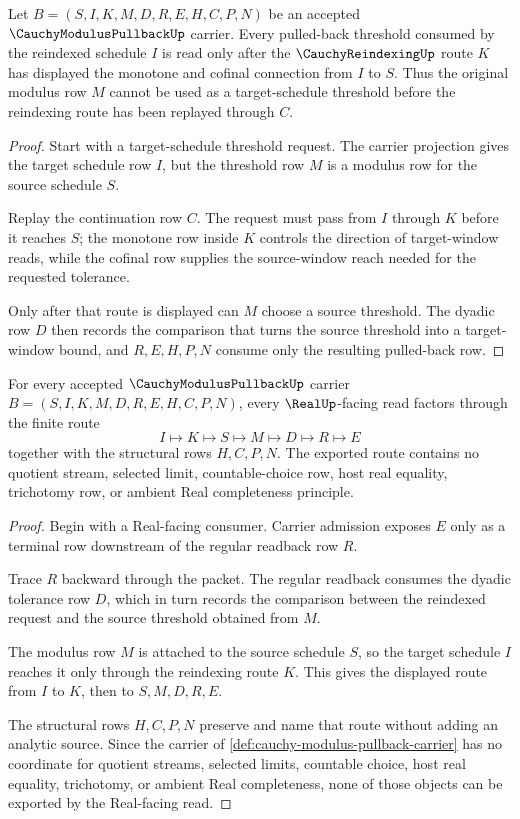 \begin{theorem}
\label{thm:cauchy-modulus-pullback-reindex-threshold}
Let $B=(S,I,K,M,D,R,E,H,C,P,N)$ be an accepted $\CauchyModulusPullbackUp$ carrier. Every pulled-back threshold consumed by the reindexed schedule $I$ is read only after the $\CauchyReindexingUp$ route $K$ has displayed the monotone and cofinal connection from $I$ to $S$. Thus the original modulus row $M$ cannot be used as a target-schedule threshold before the reindexing route has been replayed through $C$.
\end{theorem}
\begin{proof}
Start with a target-schedule threshold request. The carrier projection gives the target schedule row $I$, but the threshold row $M$ is a modulus row for the source schedule $S$.

Replay the continuation row $C$. The request must pass from $I$ through $K$ before it reaches $S$; the monotone row inside $K$ controls the direction of target-window reads, while the cofinal row supplies the source-window reach needed for the requested tolerance.

Only after that route is displayed can $M$ choose a source threshold. The dyadic row $D$ then records the comparison that turns the source threshold into a target-window bound, and $R,E,H,P,N$ consume only the resulting pulled-back row.
\end{proof}

\begin{theorem}
\label{thm:cauchy-modulus-pullback-real-seal-nonescape}
For every accepted $\CauchyModulusPullbackUp$ carrier $B=(S,I,K,M,D,R,E,H,C,P,N)$, every $\RealUp$-facing read factors through the finite route
$$
I\longmapsto K\longmapsto S\longmapsto M\longmapsto D\longmapsto R\longmapsto E
$$
together with the structural rows $H,C,P,N$. The exported route contains no quotient stream, selected limit, countable-choice row, host real equality, trichotomy row, or ambient Real completeness principle.
\end{theorem}
\begin{proof}
Begin with a Real-facing consumer. Carrier admission exposes $E$ only as a terminal row downstream of the regular readback row $R$.

Trace $R$ backward through the packet. The regular readback consumes the dyadic tolerance row $D$, which in turn records the comparison between the reindexed request and the source threshold obtained from $M$.

The modulus row $M$ is attached to the source schedule $S$, so the target schedule $I$ reaches it only through the reindexing route $K$. This gives the displayed route from $I$ to $K$, then to $S,M,D,R,E$.

The structural rows $H,C,P,N$ preserve and name that route without adding an analytic source. Since the carrier of \autoref{def:cauchy-modulus-pullback-carrier} has no coordinate for quotient streams, selected limits, countable choice, host real equality, trichotomy, or ambient Real completeness, none of those objects can be exported by the Real-facing read.
\end{proof}

